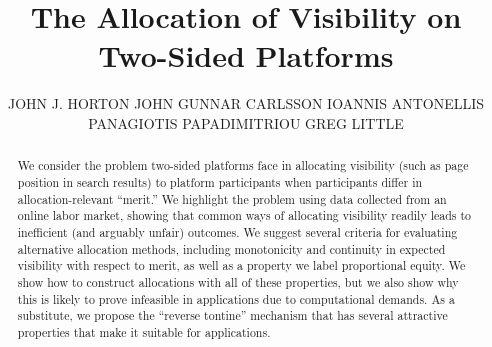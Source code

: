 \documentclass[prodmode,acmec]{acmsmall}
\begin{document}

\title{The Allocation of Visibility on Two-Sided Platforms}

\author{
    JOHN J. HORTON 
    JOHN GUNNAR CARLSSON 
    IOANNIS ANTONELLIS 
    PANAGIOTIS PAPADIMITRIOU
    GREG LITTLE 
 }

\begin{abstract} 
  We consider the problem two-sided platforms face in allocating
  visibility (such as page position in search results) to platform
  participants when participants differ in allocation-relevant
  ``merit.''  We highlight the problem using data collected from an
  online labor market, showing that common ways of allocating
  visibility readily leads to inefficient (and arguably unfair)
  outcomes. We suggest several criteria for evaluating alternative
  allocation methods, including monotonicity and continuity in
  expected visibility with respect to merit, as well as a property we
  label proportional equity.  We show how to construct allocations
  with all of these properties, but we also show why this is likely to
  prove infeasible in applications due to computational demands. As a
  substitute, we propose the ``reverse tontine'' mechanism that has
  several attractive properties that make it suitable for
  applications.
\end{abstract} 



\begin{bottomstuff}
\end{bottomstuff}

\maketitle
\end{document}
